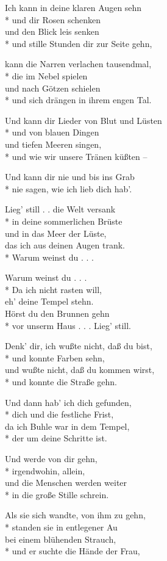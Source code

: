 Ich kann in deine klaren Augen sehn\\*
und dir Rosen schenken\\
und den Blick leis senken\\*
und stille Stunden dir zur Seite gehn,

kann die Narren verlachen tausendmal,\\*
die im Nebel spielen\\
und nach Götzen schielen\\*
und sich drängen in ihrem engen Tal.

Und kann dir Lieder von Blut und Lüsten\\*
und von blauen Dingen\\
und tiefen Meeren singen,\\*
und wie wir unsere Tränen küßten –

Und kann dir nie und bis ins Grab\\*
nie sagen, wie ich lieb dich hab'.

Lieg' still . . die Welt versank\\*
in deine sommerlichen Brüste\\
und in das Meer der Lüste,\\
[s 104]
das ich aus deinen Augen trank.\\*
Warum weinst du . . .

Warum weinst du . . .\\*
Da ich nicht rasten will,\\
eh' deine Tempel stehn.\\
Hörst du den Brunnen gehn\\*
vor unserm Haus . . . Lieg' still.

Denk' dir, ich wußte nicht, daß du bist,\\*
und konnte Farben sehn,\\
und wußte nicht, daß du kommen wirst,\\*
und konnte die Straße gehn.

Und dann hab' ich dich gefunden,\\*
dich und die festliche Frist,\\
da ich Buhle war in dem Tempel,\\*
der um deine Schritte ist.

Und werde von dir gehn,\\*
irgendwohin, allein,\\
und die Menschen werden weiter\\*
in die große Stille schrein.

Als sie sich wandte, von ihm zu gehn,\\*
standen sie in entlegener Au\\
bei einem blühenden Strauch,\\*
und er suchte die Hände der Frau,

